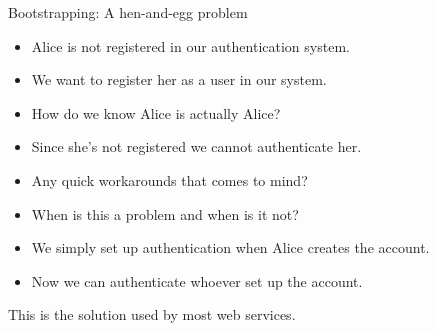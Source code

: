 \begin{frame}
  \begin{block}{Bootstrapping: A hen-and-egg problem}
    \begin{itemize}
      \item Alice is not registered in our authentication system.
      \item We want to register her as a user in our system.

        \pause{}

      \item How do we know Alice is actually Alice?
      \item Since she's not registered we cannot authenticate her.
    \end{itemize}
  \end{block}

  \pause{}

  \begin{exercise}
    \begin{itemize}
      \item Any quick workarounds that comes to mind?
      \item When is this a problem and when is it not?
    \end{itemize}
  \end{exercise}
\end{frame}

\begin{frame}
  \begin{solution}
    \begin{itemize}
      \item We simply set up authentication when Alice creates the account.
      \item Now we can authenticate whoever set up the account.
    \end{itemize}
  \end{solution}

  \pause{}

  \begin{example}
    This is the solution used by most web services.
  \end{example}
\end{frame}

